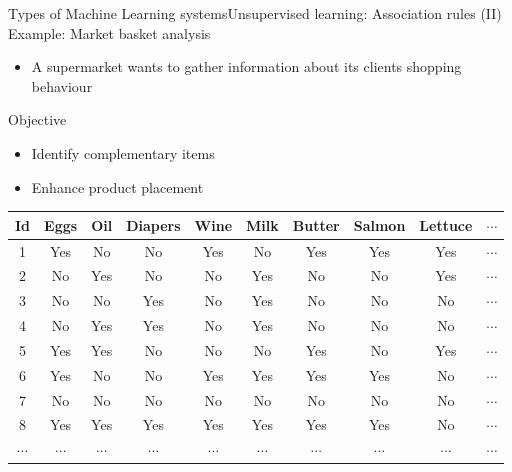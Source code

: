 \documentclass[10pt,compress]{beamer} %
\begin{document}
\begin{frame}{Types of Machine Learning systems}{Unsupervised learning: Association rules (II)}
	Example: Market basket analysis
	\begin{itemize}
		\item A supermarket wants to gather information about its clients shopping behaviour
	\end{itemize}

	Objective
	\begin{itemize}
		\item Identify complementary items
		\item Enhance product placement
	\end{itemize}

	\vspace{-0.3cm}

	\begin{center}
	\begin{tabular}{cccccccccc}\hline
		 Id & Eggs & Oil & Diapers & Wine & Milk & Butter & Salmon& Lettuce & $\cdots$ \\\hline
		 1  & Yes  & No  & No      & Yes  & No   & Yes    & Yes   & Yes  & $\cdots$ \\
		 2  & No   & Yes & No      & No   & Yes  & No     & No    & Yes  & $\cdots$ \\
		 3  & No   & No  & Yes     & No   & Yes  & No     & No    & No   & $\cdots$ \\
		 4  & No   & Yes & Yes     & No   & Yes  & No     & No    & No   & $\cdots$ \\
		 5  & Yes  & Yes & No      & No   & No   & Yes    & No    & Yes  & $\cdots$ \\
		 6  & Yes  & No  & No      & Yes  & Yes  & Yes    & Yes   & No   & $\cdots$ \\
		 7  & No   & No  & No      & No   & No   & No     & No    & No   & $\cdots$ \\
		 8  & Yes  & Yes & Yes     & Yes  & Yes  & Yes    & Yes   & No   & $\cdots$ \\
		 $\cdots$ & $\cdots$ & $\cdots$ & $\cdots$   & $\cdots$  & $\cdots$ & $\cdots$ & $\cdots$ & $\cdots$ & $\cdots$ \\
		 \hline
	 \end{tabular}
	 \end{center}
\end{frame}
\end{document}
